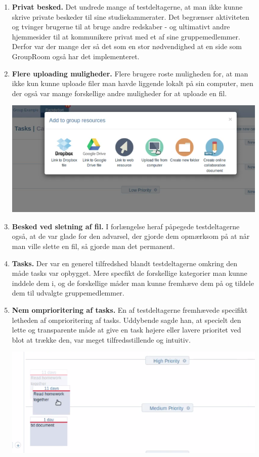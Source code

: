 \documentclass[12pt]{article}
\begin{document}
\begin{enumerate}
  \item \textbf{Privat besked.} Det undrede mange af testdeltagerne, at man ikke kunne skrive private beskeder til sine studiekammerater. Det begrænser aktiviteten og tvinger brugerne til at bruge andre redskaber - og ultimativt andre hjemmesider til at kommunikere privat med et af sine gruppemedlemmer. Derfor var der mange der så det som en stor nødvendighed at en side som GroupRoom også har det implementeret.

  \item \textbf{Flere uploading muligheder.} Flere brugere roste muligheden for, at man ikke kun kunne uploade filer man havde liggende lokalt på sin computer, men der også var mange forskellige andre muligheder for at uploade en fil.
  
      \begin{center}\includegraphics[scale=0.4]{Billeder/Add-File}\end{center}
  
  \item \textbf{Besked ved sletning af fil.} I forlængelse heraf påpegede testdeltagerne også, at de var glade for den advarsel, der gjorde dem opmærksom på at når man ville slette en fil, så gjorde man det permanent.
  
  \item \textbf{Tasks.} Der var en generel tilfredshed blandt testdeltagerne omkring den måde tasks var opbygget. Mere specfikt de forskellige kategorier man kunne inddele dem i, og de forskellige måder man kunne fremhæve dem på og tildele dem til udvalgte gruppemedlemmer.
  
  \item \textbf{Nem omprioritering af tasks.} En af testdeltagerne fremhævede specifikt letheden af omprioritering af tasks. Uddybende sagde han, at specielt den lette og transparente måde at give en task højere eller lavere prioritet ved blot at trække den, var meget tilfredsstillende og intuitiv.
      \begin{center}\includegraphics[scale=0.6]{Billeder/taskdrag}\end{center}



\end{enumerate}
\end{document}
